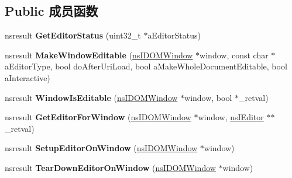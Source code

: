 \subsection*{Public 成员函数}
\begin{DoxyCompactItemize}
\item 
\mbox{\label{interfacens_i_editing_session_a43c517e8cfd4534e76f6f0c300a9068b}} 
nsresult {\bfseries Get\+Editor\+Status} (uint32\+\_\+t $\ast$a\+Editor\+Status)
\item 
\mbox{\label{interfacens_i_editing_session_afa04db20fef75621852786a63296573f}} 
nsresult {\bfseries Make\+Window\+Editable} (\hyperlink{interfacens_i_d_o_m_window}{ns\+I\+D\+O\+M\+Window} $\ast$window, const char $\ast$a\+Editor\+Type, bool do\+After\+Uri\+Load, bool a\+Make\+Whole\+Document\+Editable, bool a\+Interactive)
\item 
\mbox{\label{interfacens_i_editing_session_a742279716b40314a8ef7fa320000e9b6}} 
nsresult {\bfseries Window\+Is\+Editable} (\hyperlink{interfacens_i_d_o_m_window}{ns\+I\+D\+O\+M\+Window} $\ast$window, bool $\ast$\+\_\+retval)
\item 
\mbox{\label{interfacens_i_editing_session_abeaa54b0674fe8a2a3dd21acd6e13dd6}} 
nsresult {\bfseries Get\+Editor\+For\+Window} (\hyperlink{interfacens_i_d_o_m_window}{ns\+I\+D\+O\+M\+Window} $\ast$window, \hyperlink{interfacens_i_editor}{ns\+I\+Editor} $\ast$$\ast$\+\_\+retval)
\item 
\mbox{\label{interfacens_i_editing_session_af68e6f584c356b9c4b4f1c5a7c6fc4f9}} 
nsresult {\bfseries Setup\+Editor\+On\+Window} (\hyperlink{interfacens_i_d_o_m_window}{ns\+I\+D\+O\+M\+Window} $\ast$window)
\item 
\mbox{\label{interfacens_i_editing_session_a2a8bf0a9f38169a4d3c9f8de45875717}} 
nsresult {\bfseries Tear\+Down\+Editor\+On\+Window} (\hyperlink{interfacens_i_d_o_m_window}{ns\+I\+D\+O\+M\+Window} $\ast$window)
\item 
\mbox{\label{interfacens_i_editing_session_a364525e08006d61b9e5dc55c9aa51787}} 
$$
\end{DoxyCompactItemize}
